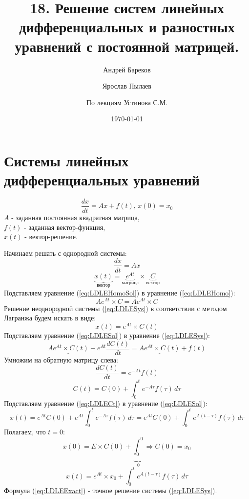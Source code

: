 \documentclass[a4paper,11pt]{article}
\title{18. Решение систем линейных дифференциальных и разностных уравнений с постоянной матрицей.}
\author{Андрей Бареков \and Ярослав Пылаев \and По лекциям Устинова С.М.}
\date{\today}
\begin{document}
\maketitle
\newpage

\section{Системы линейных дифференциальных уравнений}
\begin{importantblock}
  \begin{equation}
    \frac{dx}{dt} = Ax + f(t),\, x(0) = x_0
    \label{eq:LDLESys}
  \end{equation}
  $A$ - заданная постоянная квадратная матрица, \\
  $f(t)$ - заданная вектор-функция, \\
  $x(t)$ - вектор-решение.
\end{importantblock}
Начинаем решать с однородной системы:
\begin{equation}
  \frac{dx}{dt} = Ax
  \label{eq:LDLEHomo}
\end{equation}
\begin{equation}
  \underbrace{x(t)}_{\text{вектор}} = \underbrace{e^{At}}_{\text{матрица}} \times \underbrace{C}_{\text{вектор}}
  \label{eq:LDLEHomoSol}
\end{equation}
Подставляем уравнение (\ref{eq:LDLEHomoSol}) в уравнение (\ref{eq:LDLEHomo}):
\[Ae^{At}\times C = Ae^{At}\times C\]
Решение неоднородной системы (\ref{eq:LDLESys}) в соответствии с методом Лагранжа будем искать в виде:
\begin{equation}
  x(t) = e^{At} \times C(t)
  \label{eq:LDLESol}
\end{equation}
Подставляем уравнение (\ref{eq:LDLESol}) в уравнение (\ref{eq:LDLESys}):
\[\underline{Ae^{At}\times C(t)} + e^{At}\frac{dC(t)}{dt} = \underline{Ae^{At}\times C(t)} + f(t)\]
Умножим на обратную матрицу слева:
\[\frac{dC(t)}{dt} = e^{-At}f(t)\]
\begin{equation}
  C(t) = C(0) + \int_0^t e^{-A\tau}f(\tau)\, d\tau
  \label{eq:LDLECt}
\end{equation}
Подставляем уравнение (\ref{eq:LDLECt}) в уравнение (\ref{eq:LDLESol}):
\[x(t) = e^{At}C(0) + e^{At}\int_0^t e^{-A\tau}f(\tau)\,d\tau = e^{At}C(0)+\int_0^t e^{A(t-\tau)}f(\tau)\,d\tau\]
Полагаем, что $t = 0$:
\[x(0) = E\times C(0) + \underbrace{\int_0^0}_{0} \Rightarrow C(0) = x_0\]
\begin{equation}
  x(t) = e^{At} \times x_0 + \int_0^t e^{A(t-\tau)}f(\tau)\,d\tau
  \label{eq:LDLEExact}
\end{equation}
Формула (\ref{eq:LDLEExact}) - точное решение системы (\ref{eq:LDLESys}).
\end{document}
